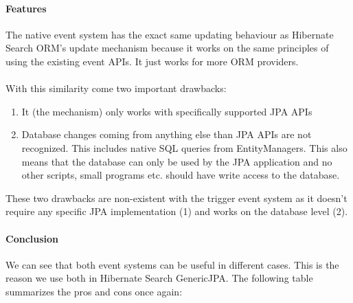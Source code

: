 \paragraph{Features}
The native event system has the exact same updating behaviour as Hibernate Search ORM's update mechanism because it works on the same principles of using the existing event APIs. It just works for more ORM providers.
\\\\
With this similarity come two important drawbacks:
\begin{enumerate}
	\item It (the mechanism) only works with specifically supported JPA APIs
	\item Database changes coming from anything else than JPA APIs are not recognized. This includes native SQL queries from EntityManagers. This also means that the database can only be used by the JPA application and no other scripts, small programs etc. should have write access to the database.
\end{enumerate}
\noindent
These two drawbacks are non-existent with the trigger event system as it doesn't require any specific JPA implementation (1) and works on the database level (2).

\paragraph{Conclusion}
We can see that both event systems can be useful in different cases. This is the reason we use both in Hibernate Search GenericJPA. The following table summarizes the pros and cons once again:

